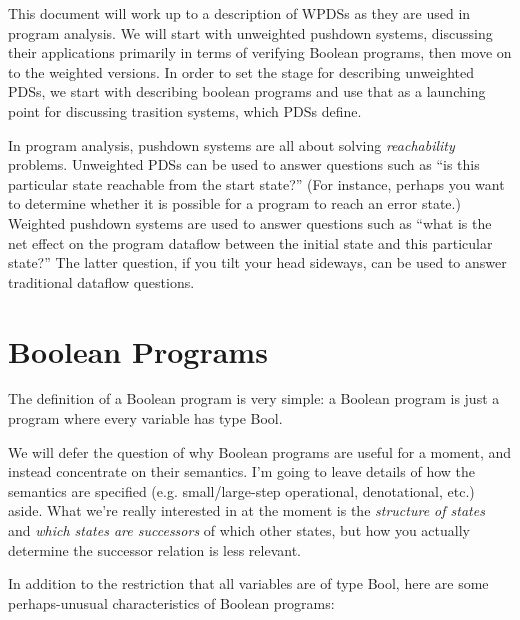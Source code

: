 \documentclass{article}
\begin{document}
This document will work up to a description of WPDSs as they are used
in program analysis. We will start with unweighted pushdown systems,
discussing their applications primarily in terms of verifying Boolean
programs, then move on to the weighted versions. In order to set the
stage for describing unweighted PDSs, we start with describing boolean
programs and use that as a launching point for discussing trasition
systems, which PDSs define.

In program analysis, pushdown systems are all about solving
\emph{reachability} problems. Unweighted PDSs can be used to answer
questions such as ``is this particular state reachable from the start
state?'' (For instance, perhaps you want to determine whether it is
possible for a program to reach an error state.) Weighted pushdown
systems are used to answer questions such as ``what is the net effect
on the program dataflow between the initial state and this particular
state?'' The latter question, if you tilt your head sideways, can be
used to answer traditional dataflow questions.


\section{Boolean Programs}
The definition of a Boolean program is very simple: a Boolean program
is just a program where every variable has type Bool.

We will defer the question of why Boolean programs are useful for a
moment, and instead concentrate on their semantics. I'm going to leave
details of how the semantics are specified (e.g. small/large-step
operational, denotational, etc.) aside. What we're really interested
in at the moment is the \emph{structure of states} and \emph{which
  states are successors} of which other states, but how you actually
determine the successor relation is less relevant.

In addition to the restriction that all variables are of type Bool,
here are some perhaps-unusual characteristics of Boolean programs:
\end{document}

